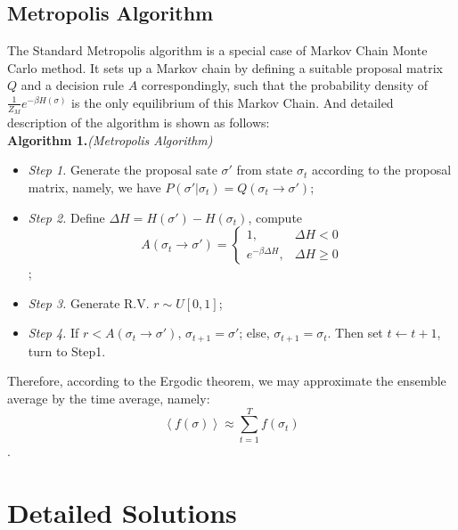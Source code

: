 \documentclass[a4paper]{article}
\begin{document}
\subsection{Metropolis Algorithm}
The Standard Metropolis algorithm is a special case of Markov Chain Monte Carlo method. It sets up a Markov chain by defining a suitable proposal matrix $Q$ and a decision rule $A$ correspondingly, such that the probability density of $\frac{1}{Z_M}e^{-\beta H(\sigma)}$ is the only equilibrium of this Markov Chain. And detailed description of the algorithm is shown as follows:\\
\textbf{Algorithm 1.}\textit{(Metropolis Algorithm)}
\begin{itemize}
    \item \textit{Step 1.} Generate the proposal sate $\sigma '$ from state $\sigma_t$  according to the proposal matrix, namely, we have $P(\sigma'|\sigma_t)=Q(\sigma_t\to \sigma ')$;
    \item \textit{Step 2.} Define $\Delta H=H(\sigma') - H(\sigma_t)$, compute
    \begin{displaymath}
    A(\sigma_t\to\sigma')= \begin{cases} 
    1, &\Delta H < 0\\
    e^{-\beta \Delta H}, &\Delta H \geq 0
    \end{cases}
    \end{displaymath};
    \item \textit{Step 3.} Generate R.V. $r\sim U[0,1]$;
    \item \textit{Step 4.} If $r < A(\sigma_t \to \sigma')$, $\sigma_{t+1}=\sigma'$; else, $\sigma_{t+1}=\sigma_t$. Then set $t \gets t+1$, turn to Step1.
\end{itemize}
Therefore, according to the Ergodic theorem, we may approximate the ensemble average by the time average, namely:
\begin{displaymath}
\left< f(\sigma) \right> \approx \sum_{t=1}^T f(\sigma_t)
\end{displaymath}.

\section{Detailed Solutions}
\end{document}
